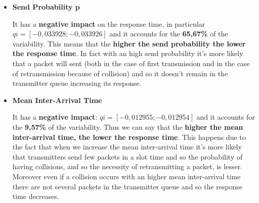 \begin{itemize}
	\item \textbf{Send Probability p}
	
	\noindent It has a \textbf{negative impact} on the response time, in particular $qi = [-0,033928; -0,033926]$ and it accounts for the \textbf{65,67\%} of the variability. This means that the \textbf{higher the send probability the lower the response time}. In fact with an high send probability it's more likely that a packet will sent (both in the case of first transmission and in the case of retransmission because of collision) and so it doesn't remain in the transmitter queue increasing its response.  
	
	\item \textbf{Mean Inter-Arrival Time}
	
	\noindent It has a \textbf{negative impact}: $qi = [-0,012955; -0,012954]$ and it accounts for the \textbf{9,57\%} of the variability. Thus we can say that the \textbf{higher the mean inter-arrival time, the lower the response time}. This happens due to the fact that when we increase the mean inter-arrival time it's more likely that transmitters send few packets in a slot time and so the probability of having collisions, and so the necessity of retransmitting a packet, is lesser. Moreover even if a collision occurs with an higher mean inter-arrival time there are not several packets in the transmitter queue and so the response time decreases. 
\end{itemize}

\newpage
